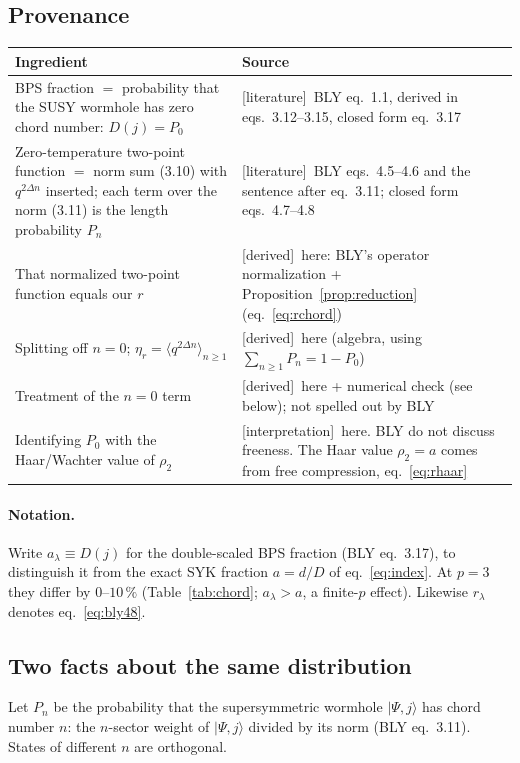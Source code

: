 \documentclass[11pt]{article}
\newcommand{\ket}[1]{\lvert #1\rangle}
\newcommand{\tagbox}[2]{\textsf{\small\color{#1}[#2]}}
\newcommand{\EST}{\tagbox{cest}{literature}}
\newcommand{\DER}{\tagbox{cder}{derived}}
\newcommand{\INTERP}{\tagbox{cconj}{interpretation}}
\theoremstyle{remark}
\begin{document}
\subsection{Provenance}\label{sec:provenance}
\begin{center}\small
\begin{tabular}{@{}p{}p{}@{}}\toprule
Ingredient & Source\\\midrule
BPS fraction $=$ probability that the SUSY wormhole has zero chord number: $D(j)=P_0$ & \EST\ BLY eq.~1.1, derived in
eqs.~3.12--3.15, closed form eq.~3.17\\
Zero-temperature two-point function $=$ norm sum (3.10) with $q^{2\Delta n}$ inserted; each term over the norm
(3.11) is the length probability $P_n$ & \EST\ BLY eqs.~4.5--4.6 and the sentence after eq.~3.11; closed form eqs.~4.7--4.8\\
That normalized two-point function equals our $r$ & \DER\ here: BLY's operator normalization + Proposition~\ref{prop:reduction} (eq.~\ref{eq:rchord})\\
Splitting off $n=0$; $\eta_r=\langle q^{2\Delta n}\rangle_{n\ge1}$ & \DER\ here (algebra, using $\sum_{n\ge1}P_n=1-P_0$)\\
Treatment of the $n=0$ term & \DER\ here + numerical check (see below); not spelled out by BLY\\
Identifying $P_0$ with the Haar/Wachter value of $\rho_2$ & \INTERP\ here. BLY do not discuss freeness. The Haar
value $\rho_2=a$ comes from free compression, eq.~\eqref{eq:rhaar}\\\bottomrule
\end{tabular}
\end{center}

\paragraph{Notation.} Write $a_\lambda\equiv D(j)$ for the double-scaled BPS fraction (BLY eq.~3.17), to distinguish it
from the exact SYK fraction $a=d/D$ of eq.~\eqref{eq:index}. At $p=3$ they differ by $0$--$10\,\%$
(Table~\ref{tab:chord}; $a_\lambda>a$, a finite-$p$ effect). Likewise $r_\lambda$ denotes eq.~\eqref{eq:bly48}.

\subsection{Two facts about the same distribution}
Let $P_n$ be the probability that the supersymmetric wormhole $\ket{\Psi,j}$ has chord number $n$: the $n$-sector
weight of $\ket{\Psi,j}$ divided by its norm (BLY eq.~3.11). States of different $n$ are orthogonal.
\end{document}
